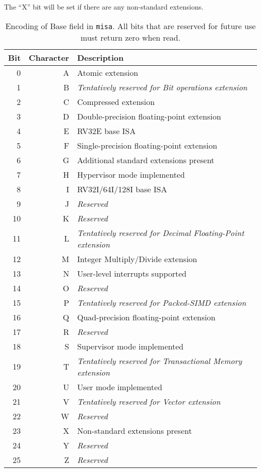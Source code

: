 The ``X'' bit will be set if there are any non-standard extensions.

\begin{table*}
\begin{center}
\begin{tabular}{|r|r|l|}
\hline
Bit & Character  & Description \\
\hline	 
  0 & A & Atomic extension \\
  1 & B & {\em Tentatively reserved for Bit operations extension} \\
  2 & C & Compressed extension \\
  3 & D & Double-precision floating-point extension \\
  4 & E & RV32E base ISA \\
  5 & F & Single-precision floating-point extension \\
  6 & G & Additional standard extensions present \\
  7 & H & Hypervisor mode implemented \\
  8 & I & RV32I/64I/128I base ISA \\
  9 & J & {\em Reserved} \\
 10 & K & {\em Reserved} \\
 11 & L & {\em Tentatively reserved for Decimal Floating-Point extension} \\
 12 & M & Integer Multiply/Divide extension \\
 13 & N & User-level interrupts supported \\
 14 & O & {\em Reserved} \\
 15 & P & {\em Tentatively reserved for Packed-SIMD extension} \\
 16 & Q & Quad-precision floating-point extension \\
 17 & R & {\em Reserved} \\
 18 & S & Supervisor mode implemented \\
 19 & T & {\em Tentatively reserved for Transactional Memory extension} \\
 20 & U & User mode implemented \\
 21 & V & {\em Tentatively reserved for Vector extension} \\
 22 & W & {\em Reserved} \\
 23 & X & Non-standard extensions present \\
 24 & Y & {\em Reserved} \\
 25 & Z & {\em Reserved} \\
\hline
\end{tabular}
\end{center}
\caption{Encoding of Base field in {\tt misa}.  All bits that are
  reserved for future use must return zero when read.}
\label{misaletters}
\end{table*}


